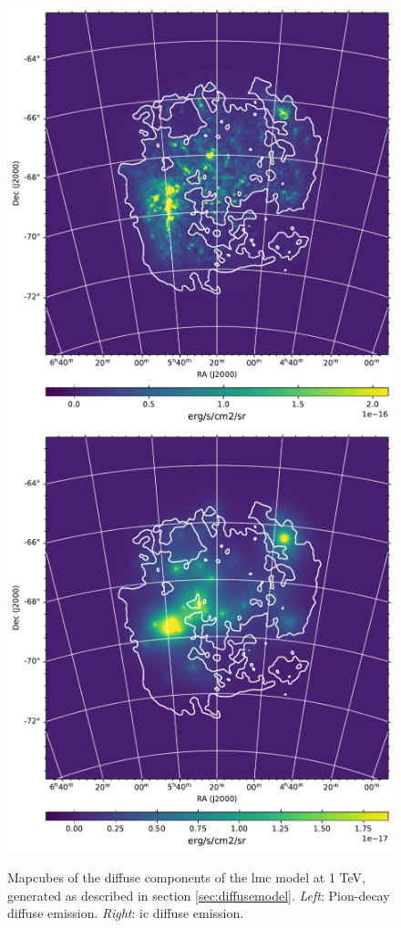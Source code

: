\documentclass[main.tex]{subfiles}
\begin{document}
\begin{figure}
\centering
{}
\includegraphics[width=1\textwidth]{Pictures/Pion_1TeVmap.pdf}
\endminipage 
{}
\includegraphics[width=1\textwidth]{Pictures/IC_1TeVmap.pdf}
\endminipage \\
  \caption{Mapcubes of the diffuse components of the \gls{lmc} model at 1 TeV, generated as described in section \ref{sec:diffusemodel}. \textit{Left}: Pion-decay diffuse emission. \textit{Right}: \gls{ic} diffuse emission.}
    \label{fig:mapmodels_cr}
\end{figure}
\end{document}
